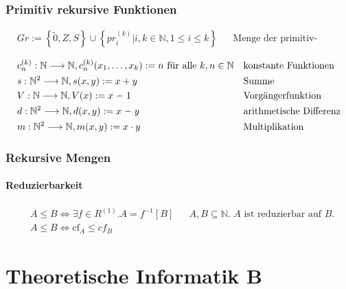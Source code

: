\documentclass[10pt,oneside,a4paper]{scrartcl}
\newcommand{\dotminus}{\stackrel{\cdot}{\relbar}}
\begin{document}
\section{Primitiv rekursive Funktionen}

    \begin{align}
    &Gr := \left\{\tilde{0}, Z, S\right\} \cup
           \left\{pr_i^{(k)}|i,k\in\mathbb{N}, 1\leq i\leq k\right\}
        && \text{Menge der primitiv-rekursiven Grundfunktionen (PRK)}
    \end{align}

    \begin{align}
    &c_n^{(k)} : \mathbb{N}\longrightarrow \mathbb{N},
        c_n^{(k)}(x_1,\ldots,x_k) := n \text{ für alle }k,n\in\mathbb{N}
        && \text{konstante Funktionen}\\
    &s : \mathbb{N}^2\longrightarrow \mathbb{N}, s(x, y) := x+y
        && \text{Summe}\\
    &V : \mathbb{N}\longrightarrow \mathbb{N}, V(x) := x \dotminus 1
        && \text{Vorgängerfunktion}\\
    &d : \mathbb{N}^2\longrightarrow \mathbb{N}, d(x, y) := x \dotminus y
        && \text{arithmetische Differenz}\\
    &m : \mathbb{N}^2\longrightarrow \mathbb{N}, m(x, y) := x \cdot y
        && \text{Multiplikation}
    \end{align}

\section{Rekursive Mengen}

\subsection{Reduzierbarkeit}

    \begin{align}
    &A \leq B \Longleftrightarrow \exists f \in R^{(1)}.A=f^{-1}[B]
        && \text{$A, B \subseteq\mathbb{N}$. $A$ ist reduzierbar auf $B$.}\\
    &A \leq B \Longleftrightarrow \text{cf}_A\leq cf_B
    \end{align}

\pagebreak

\part{Theoretische Informatik B}
\end{document}
